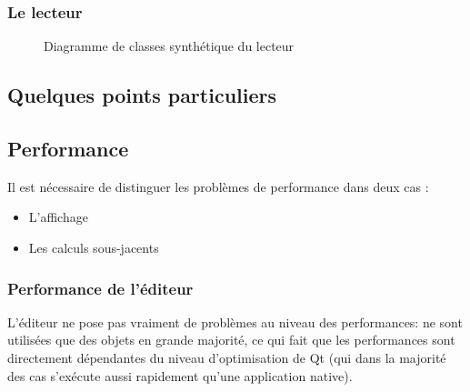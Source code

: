 \documentclass[a4paper,11pt]{article}
\begin{document}
\subsubsection{Le lecteur}

\begin{figure}[H]
\begin{center}
\caption{Diagramme de classes synthétique du lecteur}
\label{diag_player}
\end{center}
\end{figure}

\subsection{Quelques points particuliers}

\subsection{Performance}
Il est nécessaire de distinguer les problèmes de performance dans deux cas :

\begin{itemize}
	\item L'affichage
	\item Les calculs sous-jacents
\end{itemize}

\subsubsection{Performance de l'éditeur}
L'éditeur ne pose pas vraiment de problèmes au niveau des performances: ne sont utilisées que des
objets en grande majorité, ce qui fait que les performances sont directement dépendantes du niveau
d'optimisation de Qt (qui dans la majorité des cas s'exécute aussi rapidement qu'une application native).
\end{document}
